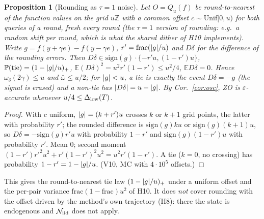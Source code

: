\documentclass[11pt,a4paper]{article}
\numberwithin{equation}{section}
\newtheorem{proposition}[theorem]{Proposition}
\theoremstyle{definition}
\theoremstyle{remark}
\newcommand{\E}{\mathbb E}\newcommand{\R}{\mathbb R}\newcommand{\Z}{\mathbb Z}\newcommand{\Prob}{\mathbb P}
\newcommand{\cN}{\mathcal N}\newcommand{\cA}{\mathcal A}\newcommand{\cG}{\mathcal G}\newcommand{\cF}{\mathcal F}
\newcommand{\Unif}{\mathrm{Unif}}\newcommand{\TV}{\mathrm{TV}}\newcommand{\BC}{\mathrm{BC}}\newcommand{\tmix}{t_{\rm mix}}
\newcommand{\wbar}{\bar\omega}\newcommand{\Atwo}{\cA^{\rm 2pt}_\gamma}
\begin{document}
\begin{proposition}[Rounding as $\tau=1$ noise]\label{prop:round}
Let $O=Q_u(f)$ be round-to-nearest of the function values on the grid $u\Z$ with a common offset $c\sim\Unif[0,u)$ for both queries of a round, fresh every round (the $\tau=1$ version of rounding: e.g.\ a random shift per round, which is what the shared dither of H10 implements). Write $g=f(y+\gamma e)-f(y-\gamma e)$, $r'=\mathrm{frac}(\lvert g\rvert/u)$ and $D\delta$ for the difference of the rounding errors. Then $D\delta\in\mathrm{sign}(g)\cdot\{-r'u,(1-r')u\}$, $\Prob(\mathrm{tie})=(1-\abs g/u)_+$, $\E(D\delta)^2=u^2r'(1-r')\le u^2/4$, $\E D\delta=0$. Hence $\omega_\delta(2\gamma)\le u$ and $\wbar\le u/2$; for $\lvert g\rvert<u$, a tie is exactly the event $D\delta=-g$ (the signal is erased) and a non-tie has $\lvert D\delta\rvert=u-\lvert g\rvert$. By Cor.~\ref{cor:osc}, ZO is $\varepsilon$-accurate whenever $u/4\le\Delta_{\rm low}(T)$.
\end{proposition}
\begin{proof}
With $c$ uniform, $\lvert g\rvert=(k+r')u$ crosses $k$ or $k+1$ grid points, the latter with probability $r'$; the rounded difference is $\mathrm{sign}(g)ku$ or $\mathrm{sign}(g)(k+1)u$, so $D\delta=-\mathrm{sign}(g)r'u$ with probability $1-r'$ and $\mathrm{sign}(g)(1-r')u$ with probability $r'$. Mean $0$; second moment $(1-r')r'^2u^2+r'(1-r')^2u^2=u^2r'(1-r')$. A tie ($k=0$, no crossing) has probability $1-r'=1-\lvert g\rvert/u$. (V10, MC with $4\cdot10^5$ offsets.)
\end{proof}
This gives the round-to-nearest tie law $(1-\lvert g\rvert/u)_+$ under a uniform offset and the per-pair variance $\mathrm{frac}(1-\mathrm{frac})u^2$ of H10. It does \emph{not} cover rounding with the offset driven by the method's own trajectory (H8): there the state is endogenous and $\cN_\iid$ does not apply.
\end{document}
